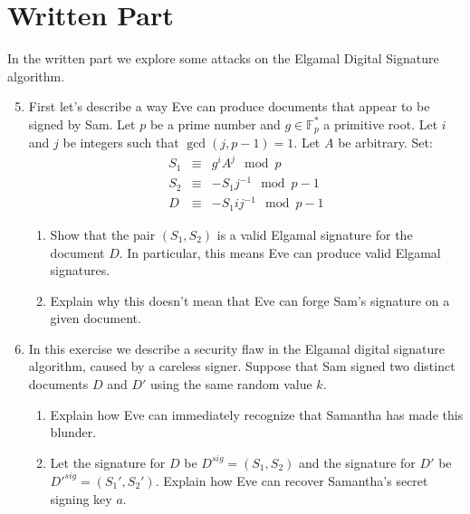\documentclass[11pt]{article}
\newcommand{\bF}{\mathbb{F}}
\begin{document}
\section*{Written Part}
In the written part we explore some attacks on the Elgamal Digital Signature algorithm.
\begin{enumerate}
  \setcounter{enumi}{4}
  \item{
  First let's describe a way Eve can produce documents that appear to be signed by Sam.  Let $p$ be a prime number and $g\in\bF_p^*$ a primitive root.  Let $i$ and $j$ be integers such that $\gcd(j,p-1)=1$.  Let $A$ be arbitrary.  Set:
  \begin{eqnarray*}
    S_1&\equiv& g^iA^j\mod p\\
    S_2 &\equiv& -S_1j^{-1}\mod p-1\\
    D &\equiv& -S_1ij^{-1}\mod p-1
  \end{eqnarray*}
  \begin{enumerate}
    \item{
    Show that the pair $(S_1,S_2)$ is a valid Elgamal signature for the document $D$.  In particular, this means Eve can produce valid Elgamal signatures.
    }
    \item{
    Explain why this doesn't mean that Eve can forge Sam's signature on a given document.
    }
  \end{enumerate}
  }
  \item{
  In this exercise we describe a security flaw in the Elgamal digital signature algorithm, caused by a careless signer.  Suppose that Sam signed two distinct documents $D$ and $D'$ using the same random value $k$.
  \begin{enumerate}
    \item{
    Explain how Eve can immediately recognize that Samantha has made this blunder.
    }
    \item{
    Let the signature for $D$ be $D^{sig} = (S_1,S_2)$ and the signature for $D'$ be $D'^{sig} = (S_1',S_2')$.  Explain how Eve can recover Samantha's secret signing key $a$.
    }
  \end{enumerate}
  }
\end{enumerate}
\end{document}

